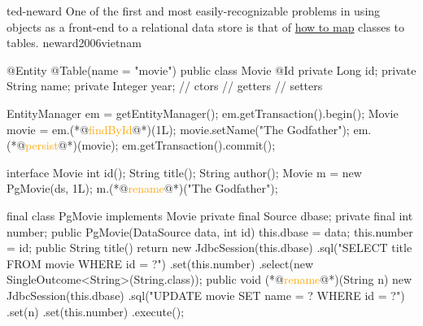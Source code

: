 \documentclass{article}
\begin{document}
\lnQuote
  {ted-neward}
  {One of the first and most easily-recognizable problems in using objects as a front-end to a relational data store is that of \ul{how to map} classes to tables.}
  {neward2006vietnam}

\begin{lnSnippet}
@Entity
@Table(name = "movie")
public class Movie {
  @Id
  private Long id;
  private String name;
  private Integer year;
  // ctors
  // getters
  // setters
}
\end{lnSnippet}
\begin{lnSnippet}
EntityManager em = getEntityManager();
em.getTransaction().begin();
Movie movie = em.(*@\textcolor{orange}{findById}@*)(1L);
movie.setName("The Godfather");
em.(*@\textcolor{orange}{persist}@*)(movie);
em.getTransaction().commit();
\end{lnSnippet}

\begin{lnSnippet}
interface Movie {
  int id();
  String title();
  String author();
}
Movie m = new PgMovie(ds, 1L);
m.(*@\textcolor{orange}{rename}@*)("The Godfather");
\end{lnSnippet}
\begin{lnSnippet}
final class PgMovie implements Movie
  private final Source dbase;
  private final int number;
  public PgMovie(DataSource data, int id)
    this.dbase = data;
    this.number = id;
  public String title()
    return new JdbcSession(this.dbase)
      .sql("SELECT title FROM movie WHERE id = ?")
      .set(this.number)
      .select(new SingleOutcome<String>(String.class));
  public void (*@\textcolor{orange}{rename}@*)(String n)
    new JdbcSession(this.dbase)
      .sql("UPDATE movie SET name = ? WHERE id = ?")
      .set(n)
      .set(this.number)
      .execute();
\end{lnSnippet}
\end{document}

